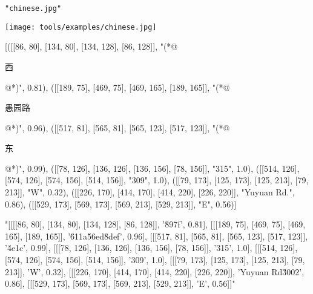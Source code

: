 \begin{textcolorbox}
 \texttt{"chinese.jpg"}

\vspace{0.2cm}
\texttt{[image: tools/examples/chinese.jpg]}
\vspace{0.2cm}

\begin{codebox}
{
    [([[86, 80], [134, 80], [134, 128], [86, 128]], "(*@\begin{CJK}{UTF8}{gbsn}西\end{CJK}@*)", 0.81), 
    ([[189, 75], [469, 75], [469, 165], [189, 165]], "(*@\begin{CJK}{UTF8}{gbsn}愚园路\end{CJK}@*)", 0.96), 
    ([[517, 81], [565, 81], [565, 123], [517, 123]], "(*@\begin{CJK}{UTF8}{gbsn}东\end{CJK}@*)", 0.99), 
    ([[78, 126], [136, 126], [136, 156], [78, 156]], "315", 1.0), 
    ([[514, 126], [574, 126], [574, 156], [514, 156]], "309", 1.0), 
    ([[79, 173], [125, 173], [125, 213], [79, 213]], "W", 0.32), 
    ([[226, 170], [414, 170], [414, 220], [226, 220]], "Yuyuan Rd.", 0.86), 
    ([[529, 173], [569, 173], [569, 213], [529, 213]], "E", 0.56)]
}
\end{codebox}
\begin{codebox}
{
    "[[[[86, 80], [134, 80], [134, 128], [86, 128]], '\u897f', 0.81], [[[189, 75], [469, 75], [469, 165], [189, 165]], '\u611a\u56ed\u8def', 0.96], [[[517, 81], [565, 81], [565, 123], [517, 123]], '\u4e1c', 0.99], [[[78, 126], [136, 126], [136, 156], [78, 156]], '315', 1.0], [[[514, 126], [574, 126], [574, 156], [514, 156]], '309', 1.0], [[[79, 173], [125, 173], [125, 213], [79, 213]], 'W', 0.32], [[[226, 170], [414, 170], [414, 220], [226, 220]], 'Yuyuan Rd\u3002', 0.86], [[[529, 173], [569, 173], [569, 213], [529, 213]], 'E', 0.56]]"
}
\end{codebox}

\end{textcolorbox}


